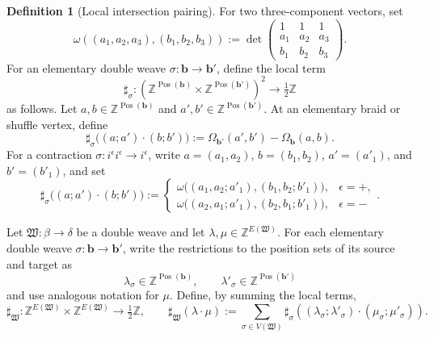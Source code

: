 \documentclass[10pt,a4paper]{article}
\theoremstyle{definition}
\newtheorem{definition}[theorem]{Definition}
\theoremstyle{remark}
\newcommand{\fW}{\mathfrak W}
\begin{document}
\begin{definition}[Local intersection pairing]
\label{def:local-intersection}
For two three-component vectors, set
\[
 \omega((a_1,a_2,a_3),(b_1,b_2,b_3))
 :=\det\!\begin{pmatrix}
  1&1&1\\
  a_1&a_2&a_3\\
  b_1&b_2&b_3
 \end{pmatrix}.
\]
For an elementary double weave \(\sigma:\mathbf b\to\mathbf b'\), define the
local term
\[
 \sharp_\sigma:
 \left(
  \mathbb Z^{\operatorname{Pos}(\mathbf b)}
  \times\mathbb Z^{\operatorname{Pos}(\mathbf b')}
  \right)^{\!2}
 \longrightarrow\tfrac12\mathbb Z
\]
as follows.  Let \(a,b\in\mathbb Z^{\operatorname{Pos}(\mathbf b)}\) and
\(a',b'\in\mathbb Z^{\operatorname{Pos}(\mathbf b')}\).  At an elementary
braid or shuffle vertex, define
\begin{equation}
 \sharp_\sigma\bigl((a;a')\mathbin{\cdot}(b;b')\bigr)
 :=\Omega_{\mathbf b'}(a',b')-\Omega_{\mathbf b}(a,b).
 \label{eq:braid-local}
\end{equation}
For a contraction \(\sigma:i^\epsilon i^\epsilon\to i^\epsilon\), write
\(a=(a_1,a_2)\), \(b=(b_1,b_2)\), \(a'=(a'_1)\), and \(b'=(b'_1)\), and set
\begin{equation}
 \sharp_\sigma\bigl((a;a')\mathbin{\cdot}(b;b')\bigr)
 :=
 \begin{cases}
  \omega\bigl((a_1,a_2;a'_1),(b_1,b_2;b'_1)\bigr),&\epsilon=+,\\
  \omega\bigl((a_2,a_1;a'_1),(b_2,b_1;b'_1)\bigr),&\epsilon=-
 \end{cases}.
 \label{eq:contraction-local}
\end{equation}

Let \(\fW:\beta\to\delta\) be a double weave and let
\(\lambda,\mu\in\mathbb Z^{E(\fW)}\).  For each elementary double weave
\(\sigma:\mathbf b\to\mathbf b'\), write the restrictions to the position
sets of its source and target as
\[
 \lambda_\sigma
 \in\mathbb Z^{\operatorname{Pos}(\mathbf b)},
 \qquad
 \lambda'_\sigma
 \in\mathbb Z^{\operatorname{Pos}(\mathbf b')}
\]
and use analogous notation for \(\mu\).  Define, by summing the local terms,
\begin{equation}
 \sharp_\fW:\mathbb Z^{E(\fW)}\times\mathbb Z^{E(\fW)}
 \longrightarrow\tfrac12\mathbb Z,\qquad
 \sharp_\fW(\lambda\mathbin{\cdot}\mu):=
 \sum_{\sigma\in V(\fW)}
 \sharp_\sigma\left(
  (\lambda_\sigma;\lambda'_\sigma)
  \mathbin{\cdot}
  (\mu_\sigma;\mu'_\sigma)
 \right).
 \label{eq:local-intersection}
\end{equation}
\end{definition}
\end{document}
